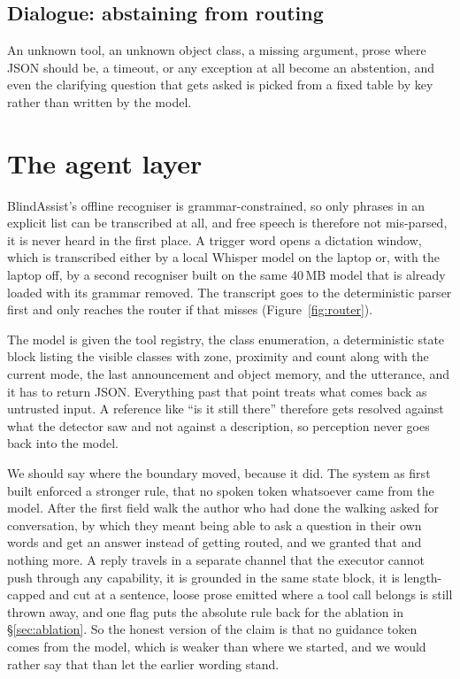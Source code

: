 \documentclass[sigconf,nonacm]{acmart}
\begin{document}
\subsection{Dialogue: abstaining from routing}

An unknown tool, an unknown object class, a missing argument, prose where JSON
should be, a timeout, or any exception at all become an abstention, and even the
clarifying question that gets asked is picked from a fixed table by key rather
than written by the model.

\section{The agent layer}

BlindAssist's offline recogniser is grammar-constrained, so only phrases in an
explicit list can be transcribed at all, and free speech is therefore not
mis-parsed, it is never heard in the first place. A trigger word opens a
dictation window, which is transcribed either by a local Whisper model
\cite{radford2023whisper} on the laptop or, with the laptop off, by a second
recogniser built on the same 40\,MB model that is already loaded with its
grammar removed. The transcript goes to the deterministic parser first and only
reaches the router if that misses (Figure~\ref{fig:router}).

The model is given the tool registry, the class enumeration, a deterministic
state block listing the visible classes with zone, proximity and count along
with the current mode, the last announcement and object memory, and the
utterance, and it has to return JSON. Everything past that point treats what
comes back as untrusted input. A reference like ``is it still there'' therefore
gets resolved against what the detector saw and not against a description, so
perception never goes back into the model.

We should say where the boundary moved, because it did. The system as first
built enforced a stronger rule, that no spoken token whatsoever came from the
model. After the first field walk the author who had done the walking asked for
conversation, by which they meant being able to ask a question in their own words
and get an answer instead of getting routed, and we granted that and nothing
more. A reply travels
in a separate channel that the executor cannot push through any capability, it
is grounded in the same state block, it is length-capped and cut at a sentence,
loose prose emitted where a tool call belongs is still thrown away, and one flag
puts the absolute rule back for the ablation in \S\ref{sec:ablation}. So the
honest version of the claim is that no guidance token comes from the model,
which is weaker than where we started, and we would rather say that than let the
earlier wording stand.
\end{document}
